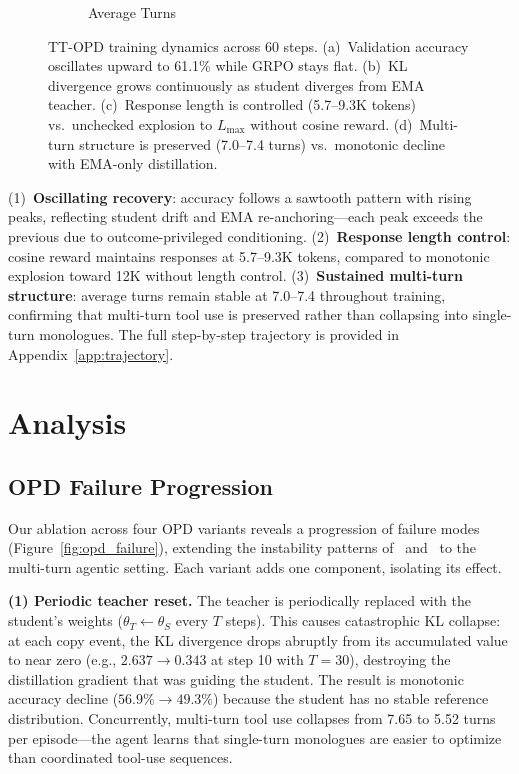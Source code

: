 \documentclass{article}
\begin{document}
\begin{figure}[t]
\begin{subfigure}[b]{0.48\textwidth}
\caption{Average Turns}
\end{subfigure}
\caption{TT-OPD training dynamics across 60 steps. (a)~Validation accuracy oscillates upward to 61.1\% while GRPO stays flat. (b)~KL divergence grows continuously as student diverges from EMA teacher. (c)~Response length is controlled (5.7--9.3K tokens) vs.\ unchecked explosion to $L_{\max}$ without cosine reward. (d)~Multi-turn structure is preserved (7.0--7.4 turns) vs.\ monotonic decline with EMA-only distillation.}
\label{fig:opd_trajectory}
\end{figure}

(1)~\textbf{Oscillating recovery}: accuracy follows a sawtooth pattern with rising peaks, reflecting student drift and EMA re-anchoring---each peak exceeds the previous due to outcome-privileged conditioning. (2)~\textbf{Response length control}: cosine reward maintains responses at 5.7--9.3K tokens, compared to monotonic explosion toward 12K without length control. (3)~\textbf{Sustained multi-turn structure}: average turns remain stable at 7.0--7.4 throughout training, confirming that multi-turn tool use is preserved rather than collapsing into single-turn monologues. The full step-by-step trajectory is provided in Appendix~\ref{app:trajectory}.


\section{Analysis}
\label{sec:analysis}

\subsection{OPD Failure Progression}
\label{sec:opd_instability}

Our ablation across four OPD variants reveals a progression of failure modes (Figure~\ref{fig:opd_failure}), extending the instability patterns of~\citet{yang26rlsd} and~\citet{zhao26opsd} to the multi-turn agentic setting. Each variant adds one component, isolating its effect.

\textbf{(1) Periodic teacher reset.} The teacher is periodically replaced with the student's weights ($\theta_T \leftarrow \theta_S$ every $T$ steps). This causes catastrophic KL collapse: at each copy event, the KL divergence drops abruptly from its accumulated value to near zero (e.g., $2.637 \to 0.343$ at step 10 with $T{=}30$), destroying the distillation gradient that was guiding the student. The result is monotonic accuracy decline ($56.9\% \to 49.3\%$) because the student has no stable reference distribution. Concurrently, multi-turn tool use collapses from 7.65 to 5.52 turns per episode---the agent learns that single-turn monologues are easier to optimize than coordinated tool-use sequences.
\end{document}
